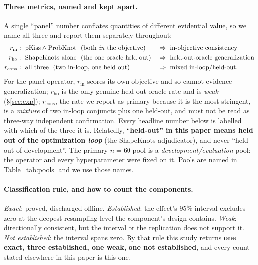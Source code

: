 \documentclass[11pt]{article}
\begin{document}
\paragraph{Three metrics, named and kept apart.} A single ``panel'' number conflates quantities of different
evidential value, so we name all three and report them separately throughout:
\begin{equation}\label{eq:metricnames}
\begin{aligned}
  r_{\mathrm{in}}  &:\ \text{pKiss}\wedge\text{ProbKnot \ (both \emph{in} the objective)}
                   &&\Rightarrow\ \text{in-objective consistency}\\
  r_{\mathrm{ho}}  &:\ \text{ShapeKnots alone \ (the one oracle held out)}
                   &&\Rightarrow\ \text{held-out-oracle generalization}\\
  r_{\mathrm{cons}} &:\ \text{all three \ (two in-loop, one held out)}
                   &&\Rightarrow\ \text{mixed in-loop/held-out}.
\end{aligned}
\end{equation}
For the panel operator, $r_{\mathrm{in}}$ scores its own objective and so cannot evidence generalization;
$r_{\mathrm{ho}}$ is the only genuine held-out-oracle rate and is \emph{weak} (\S\ref{sec:exp});
$r_{\mathrm{cons}}$, the rate we report as primary because it is the most stringent, is a
\emph{mixture} of two in-loop conjuncts plus one held-out, and must not be read as three-way independent
confirmation. Every headline number below is labelled with which of the three it is. Relatedly, \textbf{``held-out'' in this paper
means held out of the optimization \emph{loop}} (the ShapeKnots adjudicator), and never ``held out of
development''. The primary $n{=}60$ pool is a \emph{development/evaluation} pool: the operator and every
hyperparameter were fixed on it. Pools are named in Table~\ref{tab:pools} and we use those names.

\paragraph{Classification rule, and how to count the components.} \emph{Exact}: proved, discharged offline.
\emph{Established}: the effect's $95\%$ interval excludes zero at the deepest resampling level the component's
design contains. \emph{Weak}: directionally consistent, but the interval or the replication does not support
it. \emph{Not established}: the interval spans zero. By that rule this study returns \textbf{one exact, three
established, one weak, one not established}, and every count stated elsewhere in this paper is this one.
\end{document}
